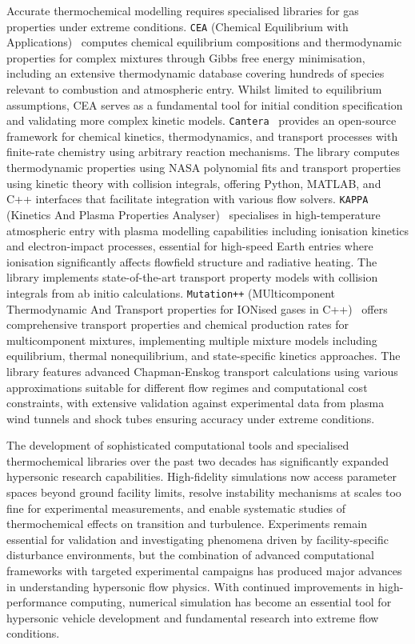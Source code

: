 Accurate thermochemical modelling requires specialised libraries for gas properties under extreme conditions. \texttt{CEA} (Chemical Equilibrium with Applications)~\citep{McBrideGordon1996} computes chemical equilibrium compositions and thermodynamic properties for complex mixtures through Gibbs free energy minimisation, including an extensive thermodynamic database covering hundreds of species relevant to combustion and atmospheric entry. Whilst limited to equilibrium assumptions, CEA serves as a fundamental tool for initial condition specification and validating more complex kinetic models. \texttt{Cantera}~\citep{GoodwinMoffatSpeth2015} provides an open-source framework for chemical kinetics, thermodynamics, and transport processes with finite-rate chemistry using arbitrary reaction mechanisms. The library computes thermodynamic properties using NASA polynomial fits and transport properties using kinetic theory with collision integrals, offering Python, MATLAB, and C++ interfaces that facilitate integration with various flow solvers. \texttt{KAPPA} (Kinetics And Plasma Properties Analyser)~\citep{CampoliEtAl2019} specialises in high-temperature atmospheric entry with plasma modelling capabilities including ionisation kinetics and electron-impact processes, essential for high-speed Earth entries where ionisation significantly affects flowfield structure and radiative heating. The library implements state-of-the-art transport property models with collision integrals from ab initio calculations. \texttt{Mutation++} (MUlticomponent Thermodynamic And Transport properties for IONised gases in C++)~\citep{Scoggins2020} offers comprehensive transport properties and chemical production rates for multicomponent mixtures, implementing multiple mixture models including equilibrium, thermal nonequilibrium, and state-specific kinetics approaches. The library features advanced Chapman-Enskog transport calculations using various approximations suitable for different flow regimes and computational cost constraints, with extensive validation against experimental data from plasma wind tunnels and shock tubes ensuring accuracy under extreme conditions.



The development of sophisticated computational tools and specialised thermochemical libraries over the past two decades has significantly expanded hypersonic research capabilities. High-fidelity simulations now access parameter spaces beyond ground facility limits, resolve instability mechanisms at scales too fine for experimental measurements, and enable systematic studies of thermochemical effects on transition and turbulence. Experiments remain essential for validation and investigating phenomena driven by facility-specific disturbance environments, but the combination of advanced computational frameworks with targeted experimental campaigns has produced major advances in understanding hypersonic flow physics. With continued improvements in high-performance computing, numerical simulation has become an essential tool for hypersonic vehicle development and fundamental research into extreme flow conditions.

